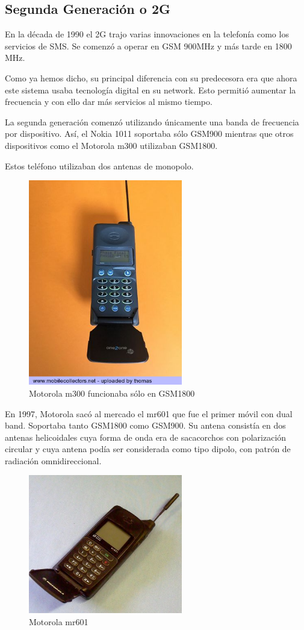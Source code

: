 \documentclass[a4paper,11pt,titlepage]{article}
\begin{document}
\subsection{Segunda Generación o 2G}
En la década de 1990 el 2G trajo varias innovaciones en la telefonía como los servicios de SMS. Se comenzó a operar en GSM 900MHz y más tarde en 1800 MHz.\par
Como ya hemos dicho, su principal diferencia con su predecesora era que ahora este sistema usaba tecnología digital en su network. Esto permitió aumentar la frecuencia y con ello dar más servicios al mismo tiempo.\par
La segunda generación comenzó utilizando únicamente una banda de frecuencia por dispositivo. Así, el Nokia 1011 soportaba sólo GSM900 mientras que otros dispositivos como el Motorola m300 utilizaban GSM1800.\par
Estos teléfono utilizaban dos antenas de monopolo.
\begin{figure}[b]
\centering
\includegraphics[width=0.6\textwidth]{motorolam300}
\caption{Motorola m300 funcionaba sólo en GSM1800}
\label{motorolam300}
\end{figure}
\par
En 1997, Motorola sacó al mercado el mr601 que fue el primer móvil con dual band. Soportaba tanto GSM1800 como GSM900. Su antena consistía en dos antenas helicoidales cuya forma de onda era de sacacorchos con polarización circular y cuya antena podía ser considerada como tipo dipolo, con patrón de radiación omnidireccional.
\begin{figure}[h]
\centering
\includegraphics[width=0.6\textwidth]{motorolamr601}
\caption{Motorola mr601}
\label{motorolamr601}
\end{figure}
\end{document}
